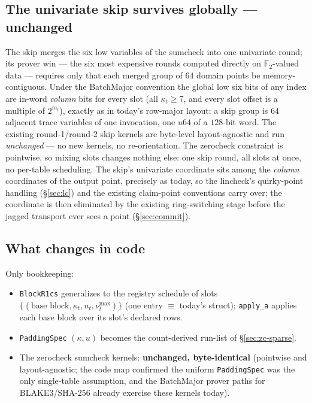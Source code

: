 \documentclass[11pt]{article}
\newcommand{\F}{\mathbb{F}}                       %
\newcommand{\Ftwo}{\F_2}
\newcommand{\code}[1]{\texttt{#1}}
\theoremstyle{definition}
\begin{document}
\subsection{The univariate skip survives globally --- unchanged}
\label{sec:skip}

The skip merges the six low variables of the sumcheck into one univariate
round; its prover win --- the six most expensive rounds computed directly
on $\Ftwo$-valued data --- requires only that each merged group of $64$
domain points be memory-contiguous. Under the BatchMajor convention the
global low six bits of any index are in-word \emph{column} bits for every
slot (all $\kappa_t \ge 7$, and every slot offset is a multiple of
$2^{m_t}$), exactly as in today's row-major layout: a skip group is $64$
adjacent trace variables of one invocation, one $u64$ of a $128$-bit
word. The existing round-1/round-2 skip kernels are byte-level
layout-agnostic and run \emph{unchanged} --- no new kernels, no
re-orientation. The zerocheck constraint is pointwise, so mixing slots
changes nothing else: one skip round, all slots at once, no per-table
scheduling. The skip's univariate coordinate sits among the \emph{column}
coordinates of the output point, precisely as today, so the lincheck's
quirky-point handling (\S\ref{sec:lc}) and the existing claim-point
conventions carry over; the coordinate is then eliminated by the existing
ring-switching stage before the jagged transport ever sees a point
(\S\ref{sec:commit}).

\subsection{What changes in code}

Only bookkeeping:
\begin{itemize}[nosep]
  \item \code{BlockR1cs} generalizes to the registry schedule of slots
        $\{(\text{base block}, \kappa_t, u_t, \nu_t^{\max})\}$ (one entry
        $\equiv$ today's struct); \code{apply\_a} applies each base block
        over its slot's declared rows.
  \item \code{PaddingSpec} $(\kappa, u)$ becomes the count-derived run-list
        of \S\ref{sec:zc-sparse}.
  \item The zerocheck sumcheck kernels: \textbf{unchanged, byte-identical}
        (pointwise and layout-agnostic; the code map confirmed the uniform
        \code{PaddingSpec} was the only single-table assumption, and the
        BatchMajor prover paths for BLAKE3/SHA-256 already exercise these
        kernels today).
\end{itemize}
\end{document}
